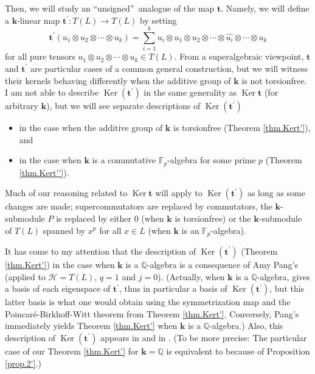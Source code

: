 \documentclass[numbers=enddot,12pt,final,onecolumn,notitlepage]{scrartcl}%
\theoremstyle{definition}
\let\sumnonlimits\sum
\renewcommand{\sum}{\sumnonlimits\limits}
\begin{document}
Then, we will study an \textquotedblleft unsigned\textquotedblright\ analogue
of the map $\mathbf{t}$. Namely, we will define a $\mathbf{k}$-linear map
$\mathbf{t}^{\prime}:T\left(  L\right)  \rightarrow T\left(  L\right)  $ by
setting%
\[
\mathbf{t}^{\prime}\left(  u_{1}\otimes u_{2}\otimes\cdots\otimes
u_{k}\right)  =\sum_{i=1}^{k}u_{i}\otimes u_{1}\otimes u_{2}\otimes
\cdots\otimes\widehat{u_{i}}\otimes\cdots\otimes u_{k}%
\]
for all pure tensors $u_{1}\otimes u_{2}\otimes\cdots\otimes u_{k}\in T\left(
L\right)  $. From a superalgebraic viewpoint, $\mathbf{t}$ and $\mathbf{t}%
^{\prime}$ are particular cases of a common general construction, but we will
witness their kernels behaving differently when the additive group of
$\mathbf{k}$ is not torsionfree. I am not able to describe
$\operatorname*{Ker}\left(  \mathbf{t}^{\prime}\right)  $ in the same
generality as $\operatorname*{Ker}\mathbf{t}$ (for arbitrary $\mathbf{k}$),
but we will see separate descriptions of $\operatorname*{Ker}\left(
\mathbf{t}^{\prime}\right)  $

\begin{itemize}
\item in the case when the additive group of $\mathbf{k}$ is torsionfree
(Theorem \ref{thm.Kert'}), and

\item in the case when $\mathbf{k}$ is a commutative $\mathbb{F}_{p}$-algebra
for some prime $p$ (Theorem \ref{thm.Kert''}).
\end{itemize}

Much of our reasoning related to $\operatorname*{Ker}\mathbf{t}$ will apply to
$\operatorname*{Ker}\left(  \mathbf{t}^{\prime}\right)  $ as long as some
changes are made; supercommutators are replaced by commutators, the
$\mathbf{k}$-submodule $P$ is replaced by either $0$ (when $\mathbf{k}$ is
torsionfree) or the $\mathbf{k}$-submodule of $T\left(  L\right)  $ spanned by
$x^{p}$ for all $x\in L$ (when $\mathbf{k}$ is an $\mathbb{F}_{p}$-algebra).

It has come to my attention that the description of $\operatorname*{Ker}%
\left(  \mathbf{t}^{\prime}\right)  $ (Theorem \ref{thm.Kert'}) in the case
when $\mathbf{k}$ is a $\mathbb{Q}$-algebra is a consequence of Amy Pang's
\cite[Theorem 5.1]{pang} (applied to $\mathcal{H}=T\left(  L\right)  $, $q=1$
and $j=0$). (Actually, when $\mathbf{k}$ is a $\mathbb{Q}$-algebra,
\cite[Theorem 5.1]{pang} gives a basis of each eigenspace of $\mathbf{t}%
^{\prime}$, thus in particular a basis of $\operatorname*{Ker}\left(
\mathbf{t}^{\prime}\right)  $, but this latter basis is what one would obtain
using the symmetrization map and the Poincar\'{e}-Birkhoff-Witt theorem from
Theorem \ref{thm.Kert'}. Conversely, Pang's \cite[Theorem 5.1]{pang}
immediately yields Theorem \ref{thm.Kert'} when $\mathbf{k}$ is a $\mathbb{Q}%
$-algebra.) Also, this description of $\operatorname*{Ker}\left(
\mathbf{t}^{\prime}\right)  $ appears in \cite[Proposition 6.1]{BRRZ08} and in
\cite[\S 1.6.5, p. 36]{Reuten93}. (To be more precise: The particular case of
our Theorem \ref{thm.Kert'} for $\mathbf{k}=\mathbb{Q}$ is equivalent to
\cite[Proposition 6.1]{BRRZ08} because of Proposition \ref{prop.2'}.)
\end{document}
